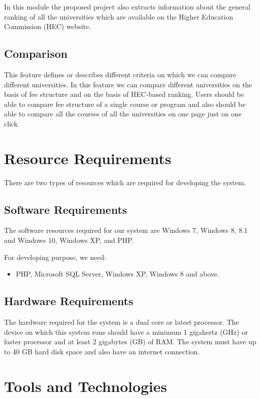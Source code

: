 In this module the proposed project also extracts information about the general ranking of all the universities which are available on the Higher Education Commission (HEC) website.

\subsection{Comparison}

This feature defines or describes different criteria on which we can compare different universities. In this feature we can compare different universities on the basis of fee structure and on the basis of HEC-based ranking. Users should be able to compare fee structure of a single course or program and also should be able to compare all the courses of all the universities on one page just on one click.

\section{Resource Requirements}

There are two types of resources which are required for developing the system.

\subsection{Software Requirements}

The software resources required for our system are Windows 7, Windows 8, 8.1 and Windows 10, Windows XP, and PHP.

For developing purpose, we need:

\begin{itemize}
    \item PHP, Microsoft SQL Server, Windows XP, Windows 8 and above.
\end{itemize}

\subsection{Hardware Requirements}

The hardware required for the system is a dual core or latest processor. The device on which this system runs should have a minimum 1 gigahertz (GHz) or faster processor and at least 2 gigabytes (GB) of RAM. The system must have up to 40 GB hard disk space and also have an internet connection.

\section{Tools and Technologies}

